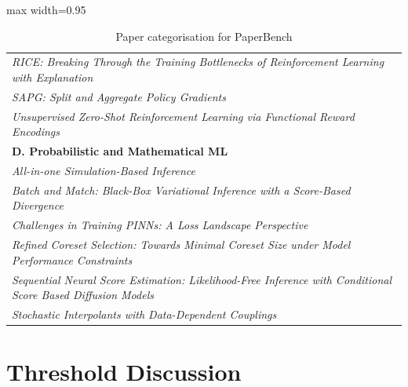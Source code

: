 \documentclass[11pt]{article}
\begin{document}
\begin{table}[h]
\begin{adjustbox}{max width=0.95\textwidth}
\begin{tabular}{l}
            \textit{RICE: Breaking Through the Training Bottlenecks of Reinforcement Learning with Explanation} \\
            \textit{SAPG: Split and Aggregate Policy Gradients} \\
            \textit{Unsupervised Zero-Shot Reinforcement Learning via Functional Reward Encodings} \\
            \midrule
            \textbf{D. Probabilistic and Mathematical ML} \\
            \midrule
            \textit{All-in-one Simulation-Based Inference} \\
            \textit{Batch and Match: Black-Box Variational Inference with a Score-Based Divergence} \\
            \textit{Challenges in Training PINNs: A Loss Landscape Perspective} \\
            \textit{Refined Coreset Selection: Towards Minimal Coreset Size under Model Performance Constraints} \\
            \textit{Sequential Neural Score Estimation: Likelihood-Free Inference with Conditional Score Based Diffusion Models} \\
            \textit{Stochastic Interpolants with Data-Dependent Couplings} \\
            \bottomrule

        \end{tabular}
        \end{adjustbox}
       
    \caption{Paper categorisation for PaperBench}
    \label{tab:qualitative_analysis}
    \vspace{-1em}
\end{table}
\clearpage
\twocolumn
\section{Threshold Discussion}
\label{app:threshold_discussion}
\end{document}
